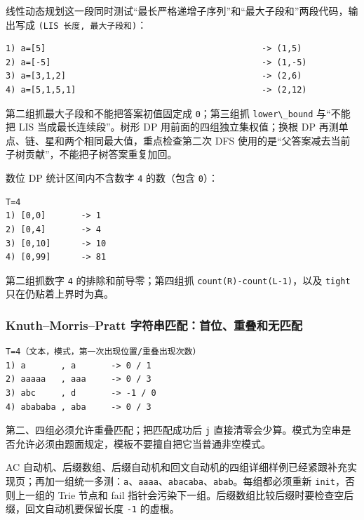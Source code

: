线性动态规划这一段同时测试``最长严格递增子序列''和``最大子段和''两段代码，输出写成 \passthrough{\lstinline!(LIS 长度, 最大子段和)!}：

\begin{lstlisting}
1) a=[5]                                           -> (1,5)
2) a=[-5]                                          -> (1,-5)
3) a=[3,1,2]                                       -> (2,6)
4) a=[5,1,5,1]                                     -> (2,12)
\end{lstlisting}

第二组抓最大子段和不能把答案初值固定成 \passthrough{\lstinline!0!}；第三组抓 \passthrough{\lstinline!lower\_bound!} 与``不能把 LIS 当成最长连续段''。树形 DP 用前面的四组独立集权值；换根 DP 再测单点、链、星和两个相同最大值，重点检查第二次 DFS 使用的是``父答案减去当前子树贡献''，不能把子树答案重复加回。

数位 DP 统计区间内不含数字 \passthrough{\lstinline!4!} 的数（包含 \passthrough{\lstinline!0!}）：

\begin{lstlisting}
T=4
1) [0,0]       -> 1
2) [0,4]       -> 4
3) [0,10]      -> 10
4) [0,99]      -> 81
\end{lstlisting}

第二组抓数字 \passthrough{\lstinline!4!} 的排除和前导零；第四组抓 \passthrough{\lstinline!count(R)-count(L-1)!}，以及 \passthrough{\lstinline!tight!} 只在仍贴着上界时为真。

\subsubsection{Knuth--Morris--Pratt 字符串匹配：首位、重叠和无匹配}

\begin{lstlisting}
T=4（文本，模式，第一次出现位置/重叠出现次数）
1) a       , a       -> 0 / 1
2) aaaaa   , aaa     -> 0 / 3
3) abc     , d       -> -1 / 0
4) abababa , aba     -> 0 / 3
\end{lstlisting}

第二、四组必须允许重叠匹配；把匹配成功后 \passthrough{\lstinline!j!} 直接清零会少算。模式为空串是否允许必须由题面规定，模板不要擅自把它当普通非空模式。

AC 自动机、后缀数组、后缀自动机和回文自动机的四组详细样例已经紧跟补充实现页；再加一组统一多测：\passthrough{\lstinline!a!}、\passthrough{\lstinline!aaaa!}、\passthrough{\lstinline!abacaba!}、\passthrough{\lstinline!abab!}。每组都必须重新 \passthrough{\lstinline!init!}，否则上一组的 Trie 节点和 fail 指针会污染下一组。后缀数组比较后缀时要检查空后缀，回文自动机要保留长度 \passthrough{\lstinline!-1!} 的虚根。

